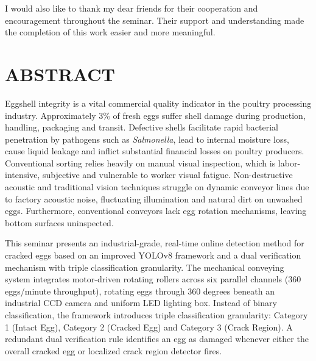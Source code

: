 \documentclass[12pt,a4paper]{report}
\begin{document}
I would also like to thank my dear friends for their cooperation and encouragement throughout the seminar. Their support and understanding made the completion of this work easier and more meaningful.

\newpage


\chapter*{ABSTRACT}

Eggshell integrity is a vital commercial quality indicator in the poultry processing industry. Approximately 3\% of fresh eggs suffer shell damage during production, handling, packaging and transit. Defective shells facilitate rapid bacterial penetration by pathogens such as \textit{Salmonella}, lead to internal moisture loss, cause liquid leakage and inflict substantial financial losses on poultry producers. Conventional sorting relies heavily on manual visual inspection, which is labor-intensive, subjective and vulnerable to worker visual fatigue. Non-destructive acoustic and traditional vision techniques struggle on dynamic conveyor lines due to factory acoustic noise, fluctuating illumination and natural dirt on unwashed eggs. Furthermore, conventional conveyors lack egg rotation mechanisms, leaving bottom surfaces uninspected.

This seminar presents an industrial-grade, real-time online detection method for cracked eggs based on an improved YOLOv8 framework and a dual verification mechanism with triple classification granularity. The mechanical conveying system integrates motor-driven rotating rollers across six parallel channels (360 eggs/minute throughput), rotating eggs through 360 degrees beneath an industrial CCD camera and uniform LED lighting box. Instead of binary classification, the framework introduces triple classification granularity: Category 1 (Intact Egg), Category 2 (Cracked Egg) and Category 3 (Crack Region). A redundant dual verification rule identifies an egg as damaged whenever either the overall cracked egg or localized crack region detector fires.
\end{document}
